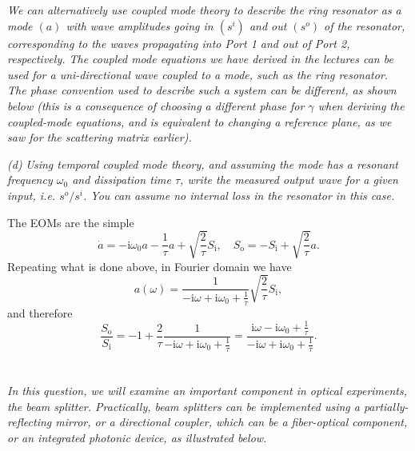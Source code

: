 \documentclass[hyperref, a4paper]{article}
\newcommand*{\ii}{\mathrm{i}}
\newcommand*{\Si}[1]{S_{\text{i#1}}}
\newcommand*{\So}[1]{S_{\text{o#1}}}
\begin{document}
\textit{We can alternatively use coupled mode theory to describe the ring resonator as a mode $(a)$ with wave amplitudes going in $\left(s^i\right)$ and out $\left(s^o\right)$ of the resonator, corresponding to the waves propagating into Port 1 and out of Port 2, respectively. The coupled mode equations we have derived in the lectures can be used for a uni-directional wave coupled to a mode, such as the ring resonator. The phase convention used to describe such a system can be different, as shown below (this is a consequence of choosing a different phase for $\gamma$ when deriving the coupled-mode equations, and is equivalent to changing a reference plane, as we saw for the scattering matrix earlier).}

\textit{(d)} \textit{Using temporal coupled mode theory, and assuming the mode has a resonant frequency $\omega_0$ and dissipation time $\tau$, write the measured output wave for a given input, i.e. $s^o / s^i$. You can assume no internal loss in the resonator in this case.} 

The EOMs are the simple 
\begin{equation}
    \dot{a} = - \ii \omega_0 a - \frac{1}{\tau} a + \sqrt{\frac{2}{\tau}} \Si{}, \quad 
    \So{} = - \Si{} + \sqrt{\frac{2}{\tau}} a.
\end{equation}
Repeating what is done above, in Fourier domain we have 
\[
    a(\omega) = \frac{1}{- \ii \omega + \ii \omega_0 + \frac{1}{\tau}} \sqrt{\frac{2}{\tau}} \Si{},
\]
and therefore 
\begin{equation}
    \frac{\So{}}{\Si{}} = - 1 + \frac{2}{\tau} \frac{1}{- \ii \omega + \ii \omega_0 + \frac{1}{\tau}} = 
    \frac{\ii \omega - \ii \omega_0 + \frac{1}{\tau}}{- \ii \omega + \ii \omega_0 + \frac{1}{\tau}}.
\end{equation}

\section{}

\textit{In this question, we will examine an important component in optical experiments, the beam splitter. Practically, beam splitters can be implemented using a partially-reflecting mirror, or a directional coupler, which can be a fiber-optical component, or an integrated photonic device, as illustrated below.}
\end{document}
